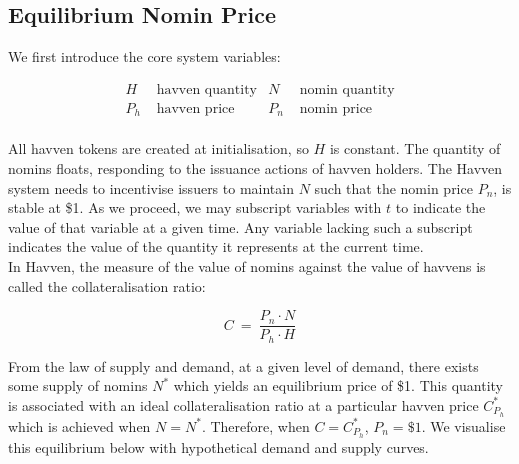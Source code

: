 \subsection{Equilibrium Nomin Price}

\noindent We first introduce the core system variables:

\begin{align*}
H &\text{\ \ havven quantity} & N &\text{\ \ nomin quantity} \\
P_h &\text{\ \ havven price}  & P_n &\text{\ \ nomin price} \\
\end{align*}


\noindent All havven tokens are created at initialisation, so \(H\) is
constant. The quantity of nomins floats, responding to the issuance actions
of havven holders. The Havven system needs to incentivise issuers to maintain
\(N\) such that the nomin price \(P_n\), is stable at \$1. As we proceed, we may
subscript variables with \(t\) to indicate the value of that variable at a
given time. Any variable lacking such a subscript indicates the value of the
quantity it represents at the current time. \\

\noindent In Havven, the measure of the value of nomins against the value of
havvens is called the collateralisation ratio:

\begin{equation}
C \ = \ \frac{P_n \cdot N}{P_h \cdot H} \label{eq:collateralisation}
\end{equation}

\vspace{3 mm}

\noindent From the law of supply and demand, at a given level of demand,
there exists some supply of nomins \(N^*\) which yields an equilibrium
price of \$1. This quantity is associated with an ideal collateralisation
ratio at a particular havven price \(C^*_{P_h}\) which is achieved when \(N = N^*\).
Therefore, when \(C = C^*_{P_h}\), \(P_n = \$1\).
We visualise this equilibrium below with hypothetical demand and supply curves. \\

\begin{center}
\end{center}

